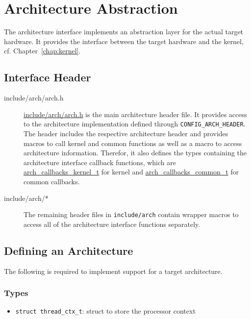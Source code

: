 %
%
%



\chapter{Architecture Abstraction\label{chap:arch}}
	The architecture interface implements an abstraction layer for the actual target hardware. It provides the interface between the target hardware and the kernel, cf. Chapter~\ref{chap:kernel}.


\section{Interface Header}
	\begin{description}
	\item[include/arch/arch.h]
		\hyperref[arch_8h]{include/arch/arch.h} is the main architecture header file. It provides access to the architecture implementation defined through \lstinline{CONFIG_ARCH_HEADER}. The header includes the respective architecture header and provides macros to call kernel and common functions as well as a macro to access architecture information. Therefor, it also defines the types containing the architecture interface callback functions, which are \hyperref[structarch__callbacks__kernel__t]{arch\_callbacks\_kernel\_t} for kernel and \hyperref[structarch__callbacks__common__t]{arch\_callbacks\_common\_t} for common callbacks.

	\item[include/arch/*]
		The remaining header files in \lstinline{include/arch} contain wrapper macros to access all of the architecture interface functions separately.
	\end{description}


\section{Defining an Architecture}
	The following is required to implement support for a target architecture.

	\subsection{Types}
		\begin{itemize}
			\item \lstinline{struct thread_ctx_t}: struct to store the processor context
		\end{itemize}

